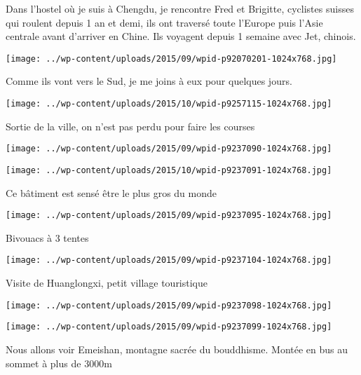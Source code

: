  \newline
 Dans l'hostel où je suis à Chengdu, je rencontre Fred et Brigitte, cyclistes suisses qui roulent depuis 1 an et demi, ils ont traversé toute l'Europe puis l'Asie centrale avant d'arriver en Chine. Ils voyagent depuis 1 semaine avec Jet, chinois. \newline
 \newline
\centerline{\texttt{[image: ../wp-content/uploads/2015/09/wpid-p92070201-1024x768.jpg]} } 
 \newline
 Comme ils vont vers le Sud, je me joins à eux pour quelques jours. \newline
 \newline
\centerline{\texttt{[image: ../wp-content/uploads/2015/10/wpid-p9257115-1024x768.jpg]} } 
 \newline
 Sortie de la ville, on n'est pas perdu pour faire les courses \newline
 \newline
\centerline{\texttt{[image: ../wp-content/uploads/2015/09/wpid-p9237090-1024x768.jpg]} } 
 \newline
 \newline
\centerline{\texttt{[image: ../wp-content/uploads/2015/10/wpid-p9237091-1024x768.jpg]} } 
 \newline
 Ce bâtiment est sensé être le plus gros du monde \newline
 \newline
\centerline{\texttt{[image: ../wp-content/uploads/2015/09/wpid-p9237095-1024x768.jpg]} } 
 \newline
 Bivouacs à 3 tentes \newline
 \newline
\centerline{\texttt{[image: ../wp-content/uploads/2015/09/wpid-p9237104-1024x768.jpg]} } 
 \newline
 Visite de Huanglongxi, petit village touristique \newline
 \newline
\centerline{\texttt{[image: ../wp-content/uploads/2015/09/wpid-p9237098-1024x768.jpg]} } 
 \newline
 \newline
\centerline{\texttt{[image: ../wp-content/uploads/2015/09/wpid-p9237099-1024x768.jpg]} } 
 \newline
 Nous allons voir Emeishan, montagne sacrée du bouddhisme. Montée en bus au sommet à plus de 3000m \newline

